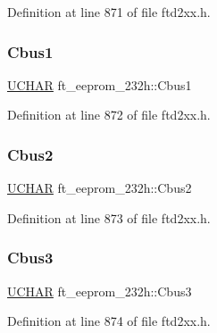 Definition at line 871 of file ftd2xx.\+h.

\mbox{\label{structft__eeprom__232h_ac56f116aab26598caa87cc9ac28376af}} 
\subsubsection{\texorpdfstring{Cbus1}{Cbus1}}
{\footnotesize\ttfamily \hyperlink{CatCaloProto40MHz_2inc_2WinTypes_8h_a4f4bb67531a9bf6f0b9c6ad76aeba587}{U\+C\+H\+AR} ft\+\_\+eeprom\+\_\+232h\+::\+Cbus1}



Definition at line 872 of file ftd2xx.\+h.

\mbox{\label{structft__eeprom__232h_acf4598ab9a02931e8359ab58308151f8}} 
\subsubsection{\texorpdfstring{Cbus2}{Cbus2}}
{\footnotesize\ttfamily \hyperlink{CatCaloProto40MHz_2inc_2WinTypes_8h_a4f4bb67531a9bf6f0b9c6ad76aeba587}{U\+C\+H\+AR} ft\+\_\+eeprom\+\_\+232h\+::\+Cbus2}



Definition at line 873 of file ftd2xx.\+h.

\mbox{\label{structft__eeprom__232h_a5dfdd3f1536dbeab687178ceef867c26}} 
\subsubsection{\texorpdfstring{Cbus3}{Cbus3}}
{\footnotesize\ttfamily \hyperlink{CatCaloProto40MHz_2inc_2WinTypes_8h_a4f4bb67531a9bf6f0b9c6ad76aeba587}{U\+C\+H\+AR} ft\+\_\+eeprom\+\_\+232h\+::\+Cbus3}



Definition at line 874 of file ftd2xx.\+h.

\mbox{\label{structft__eeprom__232h_a8c3453711bbeacd04ce19088a760d521}} 

